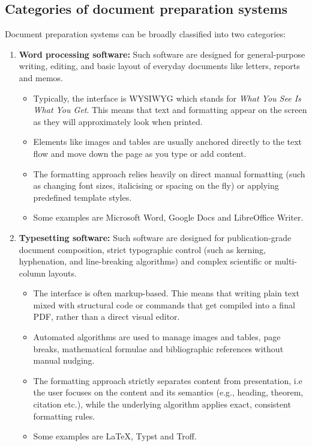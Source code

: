 	\subsection{Categories of document preparation systems}
		Document preparation systems can be broadly classified into two categories:
		\begin{enumerate}
			\item \textbf{Word processing software:} Such software are designed for general-purpose writing, editing, and basic layout of everyday documents like letters, reports and memos.
			\begin{itemize}
				\item Typically, the interface is WYSIWYG which stands for \emph{What You See Is What You Get}. This means that text and formatting appear on the screen as they will approximately look when printed.
				\item Elements like images and tables are usually anchored directly to the text flow and move down the page as you type or add content.
				\item The formatting approach relies heavily on direct manual formatting (such as changing font sizes, italicising or spacing on the fly) or applying predefined template styles.
				\item Some examples are Microsoft Word, Google Docs and LibreOffice Writer.
			\end{itemize}
			
			\item \textbf{Typesetting software:} Such software are designed for publication-grade document composition, strict typographic control (such as kerning, hyphenation, and line-breaking algorithms) and complex scientific or multi-column layouts.
			\begin{itemize}
				\item The interface is often markup-based. Thie means that writing plain text mixed with structural code or commands that get compiled into a final PDF, rather than a direct visual editor.
				\item Automated algorithms are used to manage images and tables, page breaks, mathematical formulae and bibliographic references without manual nudging.
				\item The formatting approach strictly separates content from presentation, i.e the user focuses on the content and its semantics (e.g., heading, theorem, citation etc.), while the underlying algorithm applies exact, consistent formatting rules.
				\item Some examples are \LaTeX, Typst and Troff.
			\end{itemize}
		\end{enumerate}
		
